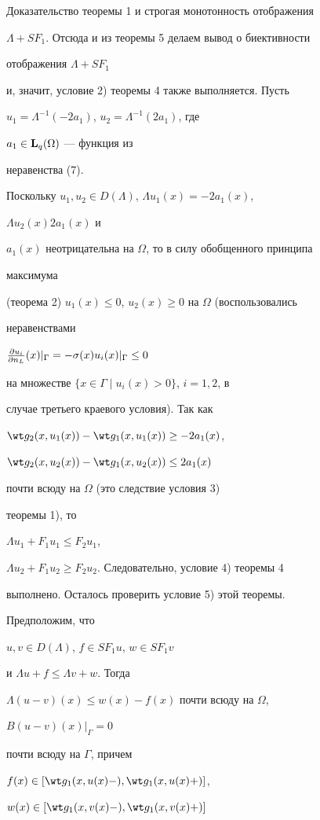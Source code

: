 \begin{pf*}{Доказательство теоремы 1}
и строгая монотонность отображения 


$\Lambda+SF_1$. Отсюда и из теоремы 5 делаем вывод о биективности 


отображения $\Lambda+SF_1$ 


и, значит, условие 2) теоремы 4 также выполняется. Пусть 


$u_1=\Lambda^{-1}(-2a_1)$, $u_2=\Lambda^{-1}(2a_1)$, где 


$a_1\in\bold L_q(\Omega)$ --- функция из 


неравенства (7). 


Поскольку $u_1,u_2\in D(\Lambda)$, $\Lambda u_1(x)=-2a_1(x)$, 


$\Lambda u_2(x)2a_1(x)$ и 


$a_1(x)$ неотрицательна на $\Omega$, то в силу обобщенного принципа 


максимума 


(теорема 2) $u_1(x)\le 0$, $u_2(x)\ge 0$ на $\Omega$ (воспользовались 


неравенствами 


$\frac{\partial u_i}{\partial n_L}(x)|_\Gamma=-\sigma(x)u_i(x)|_\Gamma\le 0$ 


на множестве $\{x\in\Gamma\mid u_i(x)>0\}$, $i=1,2$, в 


случае третьего краевого условия). Так как 


$\wt g_2(x,u_1(x))-\wt g_1(x,u_1(x))\ge-2a_1(x)$, 


$\wt g_2(x,u_2(x))-\wt g_1(x,u_2(x))\le 2a_1(x)$ 


почти всюду на $\Omega$ (это следствие условия 3) 


теоремы 1), то 


$\Lambda u_1+F_1u_1\le F_2u_1$, 


$\Lambda u_2+F_1u_2\ge F_2u_2$. Следовательно, условие 4) теоремы 4 


выполнено. Осталось проверить условие 5) этой теоремы. 


Предположим, что 


$u,v\in D(\Lambda)$, $f\in SF_1u$, $w\in SF_1v$ 


и $\Lambda u+f\le \Lambda v+w$. Тогда 


$\Lambda(u-v)(x)\le w(x)-f(x)$ почти всюду на $\Omega$, 


$B(u-v)(x)|_\Gamma=0$ 


почти всюду на $\Gamma$, причем 


$f(x)\in[\wt g_1(x,u(x)-),\wt g_1(x,u(x)+)]$, 


$w(x)\in[\wt g_1(x,v(x)-),\wt g_1(x,v(x)+)]$ 



\end{pf*}
